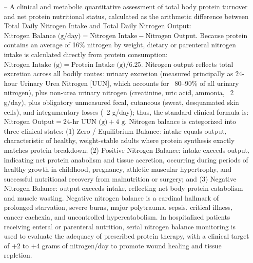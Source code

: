 -- A clinical and metabolic quantitative assessment of total body protein turnover and net protein nutritional status, calculated as the arithmetic difference between Total Daily Nitrogen Intake and Total Daily Nitrogen Output: $\text{Nitrogen Balance (g/day)} = \text{Nitrogen Intake} - \text{Nitrogen Output}$. Because protein contains an average of 16\% nitrogen by weight, dietary or parenteral nitrogen intake is calculated directly from protein consumption: $\text{Nitrogen Intake (g)} = \text{Protein Intake (g)} / 6.25$. Nitrogen output reflects total excretion across all bodily routes: urinary excretion (measured principally as 24-hour Urinary Urea Nitrogen [UUN], which accounts for ~80--90\% of all urinary nitrogen), plus non-urea urinary nitrogen (creatinine, uric acid, ammonia, ~2 g/day), plus obligatory unmeasured fecal, cutaneous (sweat, desquamated skin cells), and integumentary losses (~2 g/day); thus, the standard clinical formula is: $\text{Nitrogen Output} = \text{24-hr UUN (g)} + 4\text{ g}$. Nitrogen balance is categorized into three clinical states: (1) Zero / Equilibrium Balance: intake equals output, characteristic of healthy, weight-stable adults where protein synthesis exactly matches protein breakdown; (2) Positive Nitrogen Balance: intake exceeds output, indicating net protein anabolism and tissue accretion, occurring during periods of healthy growth in childhood, pregnancy, athletic muscular hypertrophy, and successful nutritional recovery from malnutrition or surgery; and (3) Negative Nitrogen Balance: output exceeds intake, reflecting net body protein catabolism and muscle wasting. Negative nitrogen balance is a cardinal hallmark of prolonged starvation, severe burns, major polytrauma, sepsis, critical illness, cancer cachexia, and uncontrolled hypercatabolism. In hospitalized patients receiving enteral or parenteral nutrition, serial nitrogen balance monitoring is used to evaluate the adequacy of prescribed protein therapy, with a clinical target of $+2$ to $+4$ grams of nitrogen/day to promote wound healing and tissue repletion.

